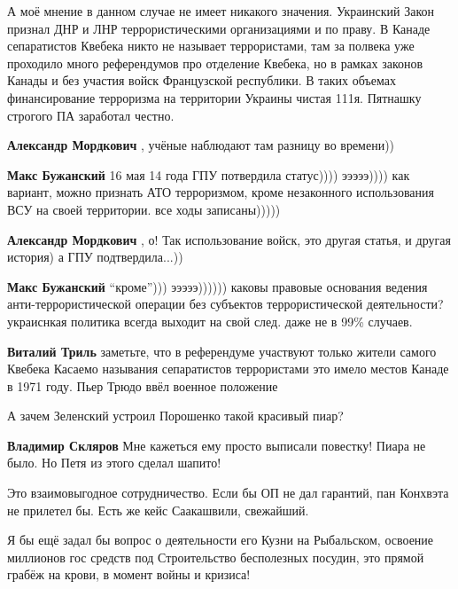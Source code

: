 \begin{itemize}
\begin{itemize}
А моё мнение в данном случае не имеет никакого значения. Украинский Закон
признал ДНР и ЛНР террористическими организациями и по праву. В Канаде
сепаратистов Квебека никто не называет террористами, там за полвека уже
проходило много референдумов про отделение Квебека, но в рамках законов Канады
и без участия войск Французской республики. В таких объемах финансирование
терроризма на территории Украины чистая 111я. Пятнашку строгого ПА заработал
честно.


\textbf{Александр Мордкович} , учёные наблюдают там разницу во времени))

\textbf{Макс Бужанский} 16 мая 14 года ГПУ потвердила статус))))
эээээ)))) как вариант, можно признать АТО терроризмом, кроме незаконного использования ВСУ на своей территории.
все ходы записаны)))))

\textbf{Александр Мордкович} , о! Так использование войск, это другая статья, и другая история) а ГПУ подтвердила...))

\textbf{Макс Бужанский} \enquote{кроме})))
эээээ)))))) каковы правовые основания ведения анти-террористической операции без субъектов террористической деятельности?
украиснкая политика всегда выходит на свой след.
даже не в 99\% случаев.

\textbf{Виталий Триль} заметьте, что в референдуме участвуют только жители самого Квебека
Касаемо называния сепаратистов террористами это имело местов Канаде в 1971 году. Пьер Трюдо ввёл военное положение
\end{itemize} %

А зачем Зеленский устроил Порошенко такой красивый пиар?

\begin{itemize} %
\textbf{Владимир Скляров} Мне кажеться ему просто выписали повестку! Пиара не было. Но Петя из этого сделал шапито!

Это взаимовыгодное сотрудничество. Если бы ОП не дал гарантий, пан Конхвэта не прилетел бы.
Есть же кейс Саакашвили, свежайший.
\end{itemize} %


Я бы ещё задал бы вопрос о деятельности его Кузни на Рыбальском, освоение
миллионов гос средств под Строительство бесполезных посудин, это прямой грабёж
на крови, в момент войны и кризиса!



\end{itemize}

